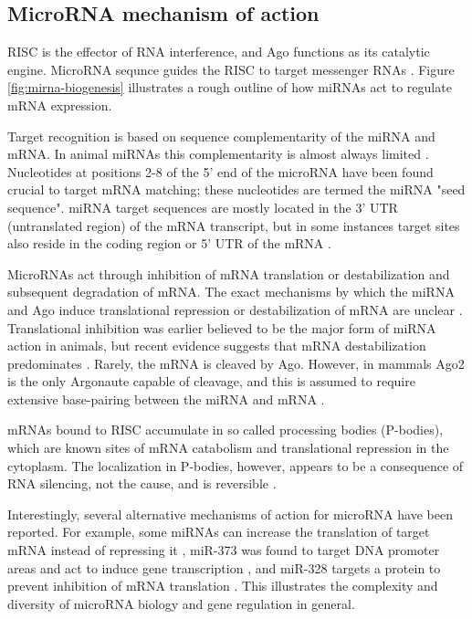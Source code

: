 \subsection{MicroRNA mechanism of action}\label{microrna-mechanism}

RISC is the effector of RNA interference, and Ago functions as its catalytic
engine. MicroRNA sequnce guides the RISC to target messenger RNAs
\citep{Filipowicz2008}. Figure \ref{fig:mirna-biogenesis} illustrates a rough
outline of how miRNAs act to regulate mRNA expression.

Target recognition is based on sequence complementarity of the miRNA and mRNA.
In animal miRNAs this complementarity is almost always limited \citep{Ambros2004}.
Nucleotides at positions 2-8 of the 5' end of the microRNA have been found
crucial to target mRNA matching; these nucleotides are termed the miRNA "seed sequence".
miRNA target sequences are mostly located in the 3' UTR (untranslated region)
of the mRNA transcript, but in some instances target sites also reside in the
coding region or 5' UTR of the mRNA \citep{Bartel2009}.

MicroRNAs act through inhibition of mRNA translation or destabilization and
subsequent degradation of mRNA. The exact mechanisms by which the miRNA and
Ago induce translational repression or destabilization of mRNA are unclear
\citep{Filipowicz2008}. Translational inhibition was earlier believed to be
the major form of miRNA action in animals, but recent evidence suggests that
mRNA destabilization predominates \citep{Guo2010}. Rarely, the mRNA is
cleaved by Ago. However, in mammals Ago2 is the only Argonaute capable of
cleavage, and this is assumed to require extensive base-pairing between
the miRNA and mRNA \citep{Du2005}.

mRNAs bound to RISC accumulate in so called processing bodies (P-bodies),
which are known sites of mRNA catabolism and translational repression in the
cytoplasm. The localization in P-bodies, however, appears to be a consequence
of RNA silencing, not the cause, and is reversible \citep{Eulalio2007}.

Interestingly, several alternative mechanisms of action for microRNA have been
reported. For example, some miRNAs can increase the translation of target mRNA instead of
repressing it \citep{Vasudevan2007}, miR-373
was found to target DNA promoter areas and act to induce gene transcription
\citep{Place2008}, and miR-328 targets a protein to prevent inhibition of mRNA
translation \citep{Eiring2010}. This illustrates the complexity and diversity of
microRNA biology and gene regulation in general.




